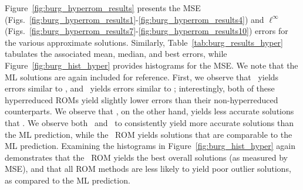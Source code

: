 \documentclass[3p,computermodern,10pt]{elsarticle}
\begin{document}
Figure~\ref{fig:burg_hyperrom_results} presents the MSE (Figs.~\ref{fig:burg_hyperrom_results1}-\ref{fig:burg_hyperrom_results4}) and $\ell^{\infty}$ (Figs.~\ref{fig:burg_hyperrom_results7}-\ref{fig:burg_hyperrom_results10}) errors for the various approximate solutions. Similarly, Table~\ref{tab:burg_results_hyper} tabulates the associated mean, median, and best errors, while Figure~\ref{fig:burg_hist_hyper} provides histograms for the MSE. We note that the ML solutions are again included for reference. First, we observe that \PSTLSROMGNAT\ yields errors similar to \PSTLSROM, and \PSTLONEROMCOLLOC\ yields errors similar to \PSTLONEROM; interestingly, both of these hyperreduced ROMs yield slightly lower errors than their non-hyperreduced counterparts. We observe that \PSTLSROMCOLLOC, on the other hand, yields less accurate solutions that \PSTLSROM. We observe both \PSTLSROMGNAT\ and \PSTLONEROMCOLLOC\ to consistently yield more accurate solutions than the ML prediction, while the \PSTLSROMCOLLOC\ ROM yields solutions that are comparable to the ML prediction. Examining the histograms in Figure~\ref{fig:burg_hist_hyper} again demonstrates that the \PSTLONEROMCOLLOC\ ROM yields the best overall solutions (as measured by MSE), and that all ROM methods are less likely to yield poor outlier solutions, as compared to the ML prediction.  
\end{document}
